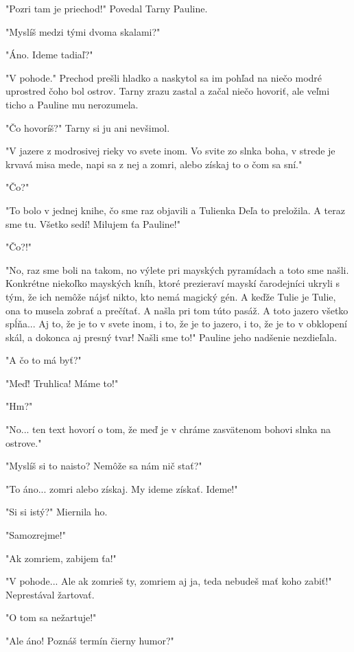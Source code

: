 \documentclass{book}
\begin{document}
"$ $Pozri tam je priechod!"$ $  Povedal Tarny Pauline.

"$ $Myslíš medzi tými dvoma skalami?"$ $ 

"$ $Áno. Ideme tadiaľ?"$ $ 

"$ $V pohode."$ $  Prechod prešli hladko a naskytol sa im pohľad na niečo modré uprostred čoho bol ostrov. Tarny zrazu zastal a začal niečo hovoriť, ale veľmi ticho a Pauline mu nerozumela.

"$ $Čo hovoríš?"$ $  Tarny si ju ani nevšimol.

"$ $V jazere z modrosivej rieky vo svete inom. Vo svite zo slnka boha, v strede je krvavá misa mede, napi sa z nej a zomri, alebo získaj to o čom sa sní."$ $ 

"$ $Čo?"$ $ 

"$ $To bolo v jednej knihe, čo sme raz objavili a Tulienka Deľa to preložila. A teraz sme tu. Všetko sedí! Milujem ťa Pauline!"$ $ 

"$ $Čo?!"$ $ 

"$ $No, raz sme boli na takom, no výlete pri mayských pyramídach a toto sme našli. Konkrétne niekoľko mayských kníh, ktoré prezieraví mayskí čarodejníci ukryli s tým, že ich nemôže nájsť nikto, kto nemá magický gén. A keďže Tulie je Tulie, ona to musela zobrať a prečítať. A našla pri tom túto pasáž. A toto jazero všetko spĺňa... Aj to, že je to v svete inom, i to, že je to jazero, i to, že je to v obklopení skál, a dokonca aj presný tvar! Našli sme to!"$ $  Pauline jeho nadšenie nezdieľala.

"$ $A čo to má byť?"$ $ 

"$ $Meď! Truhlica! Máme to!"$ $ 

"$ $Hm?"$ $ 

"$ $No... ten text hovorí o tom, že meď je v chráme zasvätenom bohovi slnka na ostrove."$ $ 

"$ $Myslíš si to naisto? Nemôže sa nám nič stať?"$ $ 

"$ $To áno... zomri alebo získaj. My ideme získať. Ideme!"$ $ 

"$ $Si si istý?"$ $  Miernila ho.

"$ $Samozrejme!"$ $ 

"$ $Ak zomriem, zabijem ťa!"$ $ 

"$ $V pohode... Ale ak zomrieš ty, zomriem aj ja, teda nebudeš mať koho zabiť!"$ $  Neprestával žartovať.

"$ $O tom sa nežartuje!"$ $ 

"$ $Ale áno! Poznáš termín čierny humor?"$ $ 
\end{document}
